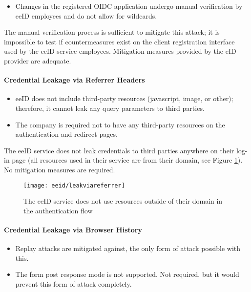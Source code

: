 \begin{itemize}
  \item Changes in the registered OIDC application undergo manual verification by eeID employees and do not allow for wildcards.
\end{itemize}

The manual verification process is sufficient to mitigate this attack; it is impossible to test if countermeasures exist on the client registration interface used by the eeID service employees. Mitigation measures provided by the eID provider are adequate.

\paragraph{Credential Leakage via Referrer Headers}

\begin{itemize}
  \item eeID does not include third-party resources (javascript, image, or other); therefore, it cannot leak any query parameters to third parties.
  \item The company is required not to have any third-party resources on the authentication and redirect pages.
\end{itemize}

The eeID service does not leak credentials to third parties anywhere on their log-in page (all resources used in their service are from their domain, see Figure \ref{fig:eeid-leakviareferrer}). No mitigation measures are required.

\begin{figure}
  \centering
  \texttt{[image: eeid/leakviareferrer]}
  \caption{The eeID service does not use resources outside of their domain in the authentication flow}
  \label{fig:eeid-leakviareferrer}
\end{figure}

\paragraph{Credential Leakage via Browser History}

\begin{itemize}
  \item Replay attacks are mitigated against, the only form of attack possible with this.
  \item The {form post} response mode is not supported. Not required, but it would prevent this form of attack completely.
\end{itemize}

